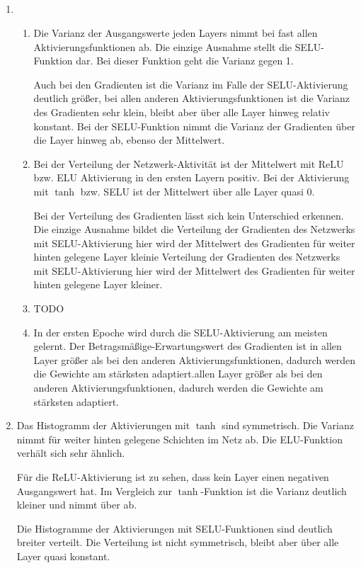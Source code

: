 \documentclass[DIN, pagenumber=false, fontsize=11pt, parskip=half]{scrartcl}
\begin{document}
    \subsection{}
    \begin{enumerate}[label=\alph*)]
        \item $ $
            \begin{enumerate}[label=\roman*.]
                \item Die Varianz der Ausgangswerte jeden Layers nimmt bei fast allen Aktivierungsfunktionen ab. Die einzige Ausnahme stellt die SELU-Funktion dar.
                    Bei dieser Funktion geht die Varianz gegen 1.

                    Auch bei den Gradienten ist die Varianz im Falle der SELU-Aktivierung deutlich größer, bei allen anderen Aktivierungsfunktionen ist die Varianz des Gradienten sehr klein, bleibt aber über alle Layer hinweg relativ konstant. Bei der SELU-Funktion nimmt die Varianz der Gradienten über die Layer hinweg ab, ebenso der Mittelwert.
                \item Bei der Verteilung der Netzwerk-Aktivität ist der Mittelwert mit ReLU bzw. ELU Aktivierung in den ersten Layern positiv. Bei der Aktivierung mit $\tanh$ bzw. SELU ist der Mittelwert über alle Layer quasi $0$.

                    Bei der Verteilung des Gradienten lässt sich kein Unterschied erkennen. Die einzige Ausnahme bildet die Verteilung der Gradienten des Netzwerks mit SELU-Aktivierung hier wird der Mittelwert des Gradienten für weiter hinten gelegene Layer kleinie Verteilung der Gradienten des Netzwerks mit SELU-Aktivierung hier wird der Mittelwert des Gradienten für weiter hinten gelegene Layer kleiner.
                \item TODO
                \item In der ersten Epoche wird durch die SELU-Aktivierung am meisten gelernt. Der Betragsmäßige-Erwartungswert des Gradienten ist in allen Layer größer als bei den anderen Aktivierungsfunktionen, dadurch werden die Gewichte am stärksten adaptiert.allen Layer größer als bei den anderen Aktivierungsfunktionen, dadurch werden die Gewichte am stärksten adaptiert.
            \end{enumerate}
        \item 
            Das Histogramm der Aktivierungen mit $\tanh$ sind symmetrisch. Die Varianz nimmt für weiter hinten gelegene Schichten im Netz ab. Die ELU-Funktion verhält sich sehr ähnlich.

            Für die ReLU-Aktivierung ist zu sehen, dass kein Layer einen negativen Ausgangswert hat. Im Vergleich zur $\tanh$-Funktion ist die Varianz deutlich kleiner und nimmt über ab.

            Die Histogramme der Aktivierungen mit SELU-Funktionen sind deutlich breiter verteilt. Die Verteilung ist nicht symmetrisch, bleibt aber über alle Layer quasi konstant.
    \end{enumerate}
\end{document}
